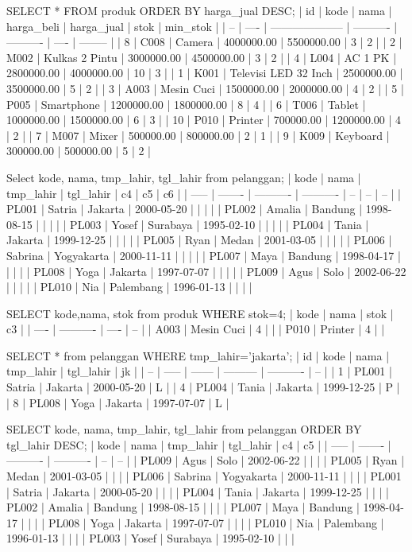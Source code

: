 SELECT * FROM produk ORDER BY harga_jual DESC;
| id | kode | nama                 | harga_beli | harga_jual | stok | min_stok |
| -- | ---- | -------------------- | ---------- | ---------- | ---- | -------- |
| 8  | C008 | Camera               | 4000000.00 | 5500000.00 | 3    | 2        |
| 2  | M002 | Kulkas 2 Pintu       | 3000000.00 | 4500000.00 | 3    | 2        |
| 4  | L004 | AC 1 PK              | 2800000.00 | 4000000.00 | 10   | 3        |
| 1  | K001 | Televisi LED 32 Inch | 2500000.00 | 3500000.00 | 5    | 2        |
| 3  | A003 | Mesin Cuci           | 1500000.00 | 2000000.00 | 4    | 2        |
| 5  | P005 | Smartphone           | 1200000.00 | 1800000.00 | 8    | 4        |
| 6  | T006 | Tablet               | 1000000.00 | 1500000.00 | 6    | 3        |
| 10 | P010 | Printer              | 700000.00  | 1200000.00 | 4    | 2        |
| 7  | M007 | Mixer                | 500000.00  | 800000.00  | 2    | 1        |
| 9  | K009 | Keyboard             | 300000.00  | 500000.00  | 5    | 2        |

Select kode, nama, tmp_lahir, tgl_lahir from pelanggan;
| kode  | nama    | tmp_lahir  | tgl_lahir  | c4 | c5 | c6 |
| ----- | ------- | ---------- | ---------- | -- | -- | -- |
| PL001 | Satria  | Jakarta    | 2000-05-20 |    |    |    |
| PL002 | Amalia  | Bandung    | 1998-08-15 |    |    |    |
| PL003 | Yosef   | Surabaya   | 1995-02-10 |    |    |    |
| PL004 | Tania   | Jakarta    | 1999-12-25 |    |    |    |
| PL005 | Ryan    | Medan      | 2001-03-05 |    |    |    |
| PL006 | Sabrina | Yogyakarta | 2000-11-11 |    |    |    |
| PL007 | Maya    | Bandung    | 1998-04-17 |    |    |    |
| PL008 | Yoga    | Jakarta    | 1997-07-07 |    |    |    |
| PL009 | Agus    | Solo       | 2002-06-22 |    |    |    |
| PL010 | Nia     | Palembang  | 1996-01-13 |    |    |    |

SELECT kode,nama, stok from produk WHERE stok=4;
| kode | nama       | stok | c3 |
| ---- | ---------- | ---- | -- |
| A003 | Mesin Cuci | 4    |    |
| P010 | Printer    | 4    |    |

SELECT * from pelanggan WHERE tmp_lahir='jakarta';
| id | kode  | nama   | tmp_lahir | tgl_lahir  | jk |
| -- | ----- | ------ | --------- | ---------- | -- |
| 1  | PL001 | Satria | Jakarta   | 2000-05-20 | L  |
| 4  | PL004 | Tania  | Jakarta   | 1999-12-25 | P  |
| 8  | PL008 | Yoga   | Jakarta   | 1997-07-07 | L  |

SELECT kode, nama, tmp_lahir, tgl_lahir from pelanggan ORDER BY tgl_lahir DESC;
| kode  | nama    | tmp_lahir  | tgl_lahir  | c4 | c5 |
| ----- | ------- | ---------- | ---------- | -- | -- |
| PL009 | Agus    | Solo       | 2002-06-22 |    |    |
| PL005 | Ryan    | Medan      | 2001-03-05 |    |    |
| PL006 | Sabrina | Yogyakarta | 2000-11-11 |    |    |
| PL001 | Satria  | Jakarta    | 2000-05-20 |    |    |
| PL004 | Tania   | Jakarta    | 1999-12-25 |    |    |
| PL002 | Amalia  | Bandung    | 1998-08-15 |    |    |
| PL007 | Maya    | Bandung    | 1998-04-17 |    |    |
| PL008 | Yoga    | Jakarta    | 1997-07-07 |    |    |
| PL010 | Nia     | Palembang  | 1996-01-13 |    |    |
| PL003 | Yosef   | Surabaya   | 1995-02-10 |    |    |
